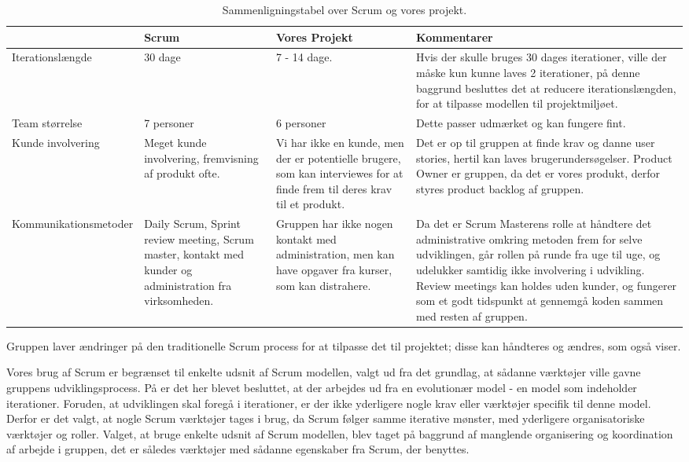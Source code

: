 \begin{sidewaystable}
      \begin{tabular}{p{5cm}p{5cm}p{5cm}p{5cm}}
	       				 & Scrum  & Vores Projekt & Kommentarer  \\ \hline

	   Iterationslængde  		
	   		& 30 dage 
	   		& 7 - 14 dage. 
	   		& Hvis der skulle bruges 30 dages iterationer, ville der måske kun kunne laves 2 iterationer, på denne baggrund besluttes det at reducere iterationslængden, for at tilpasse modellen til projektmiljøet.\\
	   		
	   Team størrelse    		
	   		& 7 personer
	   		& 6 personer 
	   		& Dette passer udmærket og kan fungere fint. \\
	   		
	   Kunde involvering 		
	   		& Meget kunde involvering, fremvisning af produkt ofte.
	   		& Vi har ikke en kunde, men der er potentielle brugere, som kan interviewes for at finde frem til deres krav til et produkt.
	   		& Det er op til gruppen at finde krav og danne user stories, hertil kan laves brugerundersøgelser. Product Owner er gruppen, da det er vores produkt, derfor styres product backlog af gruppen.\\
	   		
	   Kommunikationsmetoder	
	   		& Daily Scrum, Sprint review meeting, Scrum master, kontakt med kunder og administration fra virksomheden.
	   		& Gruppen har ikke nogen kontakt med administration, men kan have opgaver fra kurser, som kan distrahere. 
	   		& Da det er Scrum Masterens rolle at håndtere det administrative omkring metoden frem for selve udviklingen, går rollen på runde fra uge til uge, og udelukker samtidig ikke involvering i udvikling. Review meetings kan holdes uden kunder, og fungerer som et godt tidspunkt at gennemgå koden sammen med resten af gruppen. \\
    \end{tabular}
  \caption{Sammenligningstabel over Scrum og vores projekt.}\label{tabel:sammenligningstabel}
\end{sidewaystable}

Gruppen laver ændringer på den traditionelle Scrum process for at tilpasse det til projektet; disse kan håndteres og ændres, som  også viser.

Vores brug af Scrum er begrænset til enkelte udsnit af Scrum modellen, valgt ud fra det grundlag, at sådanne værktøjer ville gavne gruppens udviklingsprocess.
På  er det her blevet besluttet, at der arbejdes ud fra en evolutionær model - en model som indeholder iterationer.
Foruden, at udviklingen skal foregå i iterationer, er der ikke yderligere nogle krav eller værktøjer specifik til denne model.
Derfor er det valgt, at nogle Scrum værktøjer tages i brug, da Scrum følger samme iterative mønster, med yderligere organisatoriske værktøjer og roller.
Valget, at bruge enkelte udsnit af Scrum modellen, blev taget på baggrund af manglende organisering og koordination af arbejde i gruppen, det er således værktøjer med sådanne egenskaber fra Scrum, der benyttes.

